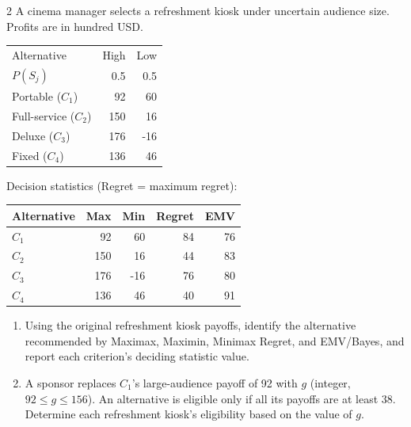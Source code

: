 \begin{multicols}{2}
\raggedcolumns
{}
A cinema manager selects a refreshment kiosk under uncertain audience size. Profits are in hundred USD.

\begin{center}\small\setlength{\tabcolsep}{4pt}
	\begin{tabular}{lrr}\toprule
		Alternative & High & Low\\
		$P(S_j)$ & 0.5 & 0.5\\ \midrule
				Portable ($C_1$) & 92 & 60\\
		Full-service ($C_2$) & 150 & 16\\
		Deluxe ($C_3$) & 176 & -16\\
		Fixed ($C_4$) & 136 & 46\\
		\bottomrule
	\end{tabular}
\end{center} \vspace{-3mm}

Decision statistics (Regret = maximum regret):

\begin{center}\small\setlength{\tabcolsep}{4pt}
	\begin{tabular}{lrrrr}\toprule
		Alternative & Max & Min & Regret & EMV\\ \midrule
				$C_1$ & 92 & 60 & 84 & 76\\
		$C_2$ & 150 & 16 & 44 & 83\\
		$C_3$ & 176 & -16 & 76 & 80\\
		$C_4$ & 136 & 46 & 40 & 91\\
		\bottomrule
	\end{tabular}
\end{center}

\begin{enumerate}[label=\textbf{(\alph*)},leftmargin=*]
	\item Using the original refreshment kiosk payoffs, identify the alternative recommended by Maximax, Maximin, Minimax Regret, and EMV/Bayes, and report each criterion's deciding statistic value. 

	\item A sponsor replaces $C_1$'s large-audience payoff of 92 with $g$ (integer, $92\leq g\leq156$). An alternative is eligible only if all its payoffs are at least 38. Determine each refreshment kiosk's eligibility based on the value of $g$. 


\end{enumerate}
\end{multicols}
